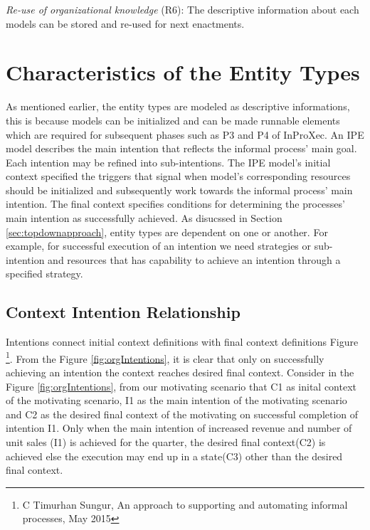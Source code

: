 \textit{Re-use of organizational knowledge} (R6): The descriptive information about each models can be stored and re-used for next enactments. 
 
\section{Characteristics of the Entity Types}
\label{sec:enttyperelation}
As mentioned earlier, the entity types are modeled as descriptive informations, this is because models can be initialized and can be made runnable elements which are required for subsequent phases such as P3 and P4 of InProXec. An IPE model describes the main intention that reflects the informal process' main goal. Each intention may be refined into sub-intentions. The IPE model's initial context specified the triggers that signal when model's corresponding resources should be initialized and subsequently work towards the informal process' main intention\cite{Sungur2015a}. The final context specifies conditions for determining the processes' main intention as successfully achieved. As disucssed in Section \ref{sec:topdownapproach}, entity types are dependent on one or another. For example, for successful execution of an intention we need strategies or sub-intention and resources that has capability to achieve an intention through a specified strategy. 

\subsection{Context Intention Relationship}
\label{sec:ctxintrel}
Intentions connect initial context definitions with final context definitions Figure \footnote{C Timurhan Sungur, An approach to supporting and automating informal processes, May 2015}. From the Figure \ref{fig:orgIntentions}, it is clear that only on successfully achieving an intention the context reaches desired final context. Consider in the Figure \ref{fig:orgIntentions}, from our motivating scenario that C1 as inital context of the motivating scenario, I1 as the main intention of the motivating scenario and C2 as the desired final context of the motivating on successful completion of intention I1. Only when the main intention of increased revenue and number of unit sales (I1) is achieved for the quarter, the desired final context(C2) is achieved else the execution may end up in a state(C3) other than the desired final context. 

